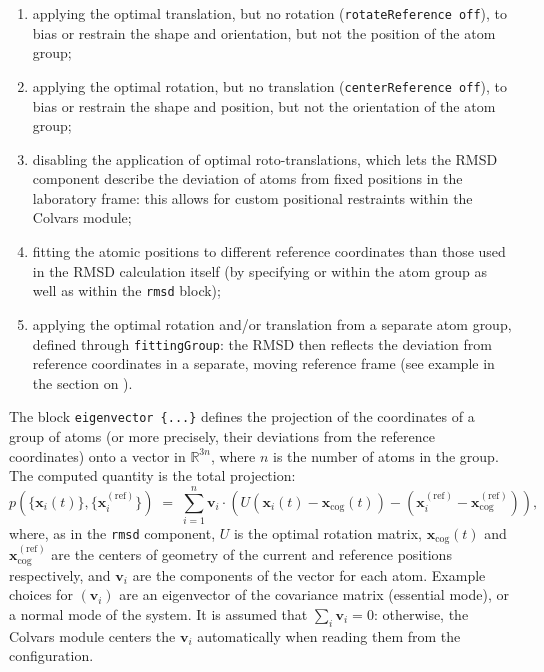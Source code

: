 \begin{enumerate}
\item applying the optimal translation, but no rotation
(\texttt{rotateReference off}), to bias or restrain the shape and
orientation, but not the position of the atom group;
\item applying the optimal rotation, but no translation
(\texttt{centerReference off}), to bias or restrain the shape and
position, but not the orientation of the atom group;
\item disabling the application of optimal roto-translations, which
lets the RMSD component describe the deviation of atoms
from fixed positions in the laboratory frame: this allows for custom
positional restraints within the Colvars module;
\item fitting the atomic positions to different reference coordinates
than those used in the RMSD calculation itself
(by specifying  or 
within the atom group as well as within the \texttt{rmsd} block);
\item applying the optimal rotation and/or translation from a separate
atom group, defined through \texttt{fittingGroup}:
the RMSD then reflects the deviation from reference coordinates in a separate, moving
reference frame (see example in the section on ).
\end{enumerate}




The block \texttt{eigenvector~\{...\}} defines the projection of the coordinates
of a group of atoms (or more precisely, their deviations from the
reference coordinates) onto a vector in $\mathbb{R}^{3n}$, where $n$ is the
number of atoms in the group. The computed quantity is the
total projection:
\begin{equation}
  \label{eq:cvc_eigenvector}
  { p(\{\mathbf{x}_{i}(t)\},
    \{\mathbf{x}_{i}^{\mathrm{(ref)}}\}) } \; = \; {
    \sum_{i=1}^{n}  \mathbf{v}_{i} \cdot
    \left(U(\mathbf{x}_{i}(t) - \mathbf{x}_{\mathrm{cog}}(t)) -
      (\mathbf{x}_{i}^{\mathrm{(ref)}} -
      \mathbf{x}_{\mathrm{cog}}^{\mathrm{(ref)}}) \right)\mathrm{,} }
\end{equation}
where, as in the \texttt{rmsd} component, $U$ is the optimal rotation
matrix, $\mathbf{x}_{\mathrm{cog}}(t)$ and
$\mathbf{x}_{\mathrm{cog}}^{\mathrm{(ref)}}$ are the centers of
geometry of the current and reference positions respectively, and
$\mathbf{v}_{i}$ are the components of the vector for each atom.
Example choices for $(\mathbf{v}_{i})$ are an eigenvector
of the covariance matrix (essential mode), or a normal
mode of the system.  It is assumed that $\sum_{i}\mathbf{v}_{i} = 0$:
otherwise, the Colvars module centers the $\mathbf{v}_{i}$
automatically when reading them from the configuration.

